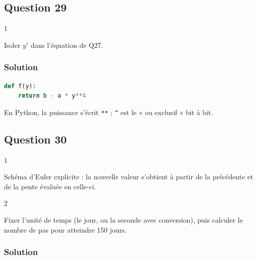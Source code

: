 \documentclass[11pt,a4paper]{article}
\begin{document}
\hypertarget{question-29}{%
\subsection{Question 29}\label{question-29}}

\begin{indication}{1}

Isoler \(y'\) dans l'équation de Q27.

\end{indication}

\hypertarget{solution-28}{%
\subsubsection{Solution}\label{solution-28}}

\begin{lstlisting}[language=Python]
def f(y):
    return b - a * y**4
\end{lstlisting}

\begin{piege}

En Python, la puissance s'écrit \texttt{**} ; \texttt{\^{}} est le « ou exclusif » bit à bit.

\end{piege}

\hypertarget{question-30}{%
\subsection{Question 30}\label{question-30}}

\begin{indication}{1}

Schéma d'Euler explicite : la nouvelle valeur s'obtient à partir de la précédente et de la pente évaluée en celle-ci.

\end{indication}

\begin{indication}{2}

Fixer l'unité de temps (le jour, ou la seconde avec conversion), puis calculer le nombre de pas pour atteindre 150 jours.

\end{indication}

\hypertarget{solution-29}{%
\subsubsection{Solution}\label{solution-29}}
\end{document}
